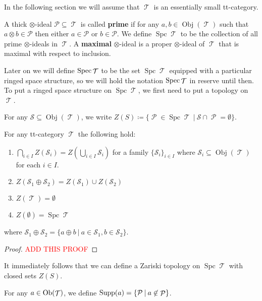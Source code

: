 \documentclass[11pt]{article}
\DeclareMathOperator{\ob}{Obj}
\DeclareMathOperator{\TT}{\mathcal{T}}
\DeclareMathOperator{\cP}{\mathcal{P}}
\DeclareMathOperator{\spc}{Spc}
\begin{document}
In the following section we will assume that $\TT$ is an essentially small tt-category.

\begin{defn}
A thick $\otimes$-ideal $\mathcal{P} \subseteq \TT$ is called \textbf{prime} if for any $a,b \in \ob(\TT)$ such that $a \otimes b \in \mathcal{P}$ then either $a \in \mathcal{P}$ or $b \in \mathcal{P}$. We define $\spc \TT$ to be the collection of all prime $\otimes$-ideals in $\TT$. A \textbf{maximal} $\otimes$-ideal is a proper $\otimes$-ideal of $\TT$ that is maximal with respect to inclusion.
\end{defn}

Later on we will define $\Spec \TT $ to be the set $\spc \TT$ equipped with a particular ringed space structure, so we will hold the notation $\Spec \TT$ in reserve until then. To put a ringed space structure on $\spc \TT$, we first need to put a topology on $\TT$.

\begin{defn}
For any $\mathcal{S} \subseteq \ob(\TT)$, we write $Z(S) \coloneqq \{\cP \in \spc \TT\:|\:\mathcal{S}\cap \cP = \emptyset\}$.
\end{defn}


\begin{prop}
For any tt-category $\TT$ the following hold:
\begin{enumerate}[1.]
	\item $\bigcap_{i \in I}Z(\mathcal{S}_i) = Z(\bigcup_{i \in I}\mathcal{S}_i)$ for a family $\{\mathcal{S}_i\}_{i \in I}$ where $\mathcal{S}_i \subseteq \ob(\TT)$ for each $i \in I$.
	\item $Z(\mathcal{S}_1 \oplus \mathcal{S}_2) = Z(\mathcal{S}_1) \cup Z(\mathcal{S}_2)$ 
	\item $Z(\TT) = \emptyset$
	\item $Z(\emptyset) = \spc \TT$
\end{enumerate}
where $\mathcal{S}_1 \oplus \mathcal{S}_2 = \{a \oplus b\:|\: a \in \mathcal{S}_1, b \in \mathcal{S}_2\}$.
\end{prop}
\begin{proof}
\large{\textcolor{red}{ADD THIS PROOF}}
\end{proof}

It immediately follows that we can define a Zariski topology on $\spc \TT$ with closed sets $Z(S)$.

\begin{defn}
For any $a \in \Ob(\TT)$, we define $\Supp(a) = \{\mathcal{P}\:|\: a \not\in \cP\}$.
\end{defn}
\end{document}
